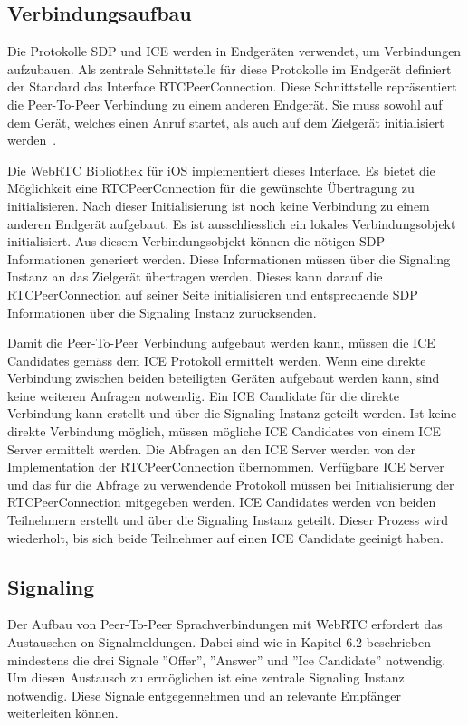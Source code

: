 \subsection{Verbindungsaufbau}

Die Protokolle SDP und ICE werden in Endgeräten verwendet, um Verbindungen aufzubauen.
Als zentrale Schnittstelle für diese Protokolle im Endgerät definiert der Standard das Interface RTCPeerConnection.
Diese Schnittstelle repräsentiert die Peer-To-Peer Verbindung zu einem anderen Endgerät.
Sie muss sowohl auf dem Gerät, welches einen Anruf startet, als auch auf dem Zielgerät initialisiert werden~\cite{webrtc_spec}.

Die WebRTC Bibliothek für iOS implementiert dieses Interface.
Es bietet die Möglichkeit eine RTCPeerConnection für die gewünschte Übertragung zu initialisieren.
Nach dieser Initialisierung ist noch keine Verbindung zu einem anderen Endgerät aufgebaut.
Es ist ausschliesslich ein lokales Verbindungsobjekt initialisiert.
Aus diesem Verbindungsobjekt können die nötigen SDP Informationen generiert werden.
Diese Informationen müssen über die Signaling Instanz an das Zielgerät übertragen werden.
Dieses kann darauf die RTCPeerConnection auf seiner Seite initialisieren und entsprechende SDP Informationen über die Signaling Instanz zurücksenden.

Damit die Peer-To-Peer Verbindung aufgebaut werden kann, müssen die ICE Candidates gemäss dem ICE Protokoll ermittelt werden.
Wenn eine direkte Verbindung zwischen beiden beteiligten Geräten aufgebaut werden kann, sind keine weiteren Anfragen notwendig.
Ein ICE Candidate für die direkte Verbindung kann erstellt und über die Signaling Instanz geteilt werden.
Ist keine direkte Verbindung möglich, müssen mögliche ICE Candidates von einem ICE Server ermittelt werden.
Die Abfragen an den ICE Server werden von der Implementation der RTCPeerConnection übernommen.
Verfügbare ICE Server und das für die Abfrage zu verwendende Protokoll müssen bei Initialisierung der RTCPeerConnection mitgegeben werden.
ICE Candidates werden von beiden Teilnehmern erstellt und über die Signaling Instanz geteilt.
Dieser Prozess wird wiederholt, bis sich beide Teilnehmer auf einen ICE Candidate geeinigt haben.

\subsection{Signaling}

Der Aufbau von Peer-To-Peer Sprachverbindungen mit WebRTC erfordert das Austauschen on Signalmeldungen.
Dabei sind wie in Kapitel 6.2 beschrieben mindestens die drei Signale ''Offer'', ''Answer'' und ''Ice Candidate'' notwendig.
Um diesen Austausch zu ermöglichen ist eine zentrale Signaling Instanz notwendig.
Diese Signale entgegennehmen und an relevante Empfänger weiterleiten können.

